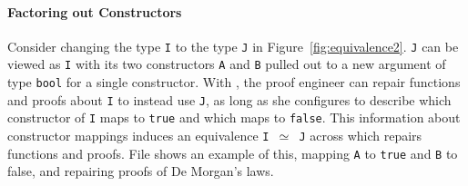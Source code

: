 \paragraph{Factoring out Constructors}
Consider changing the type \lstinline{I} to the type \lstinline{J} 
in Figure~\ref{fig:equivalence2}.
\lstinline{J} can be viewed as \lstinline{I} with its two constructors \lstinline{A} and \lstinline{B} pulled out to a
new argument of type \lstinline{bool} for a single constructor.
With \toolnamec, the proof engineer can repair functions and proofs about \lstinline{I} to instead use \lstinline{J},
as long as she configures \toolnamec to describe which constructor 
of \lstinline{I} maps to \lstinline{true} and which maps to \lstinline{false}.
This information about constructor mappings induces an equivalence \lstinline{I }$\simeq$\lstinline{ J}
across which \toolnamec repairs functions and proofs.
File \href{https://github.com/uwplse/pumpkin-pi/blob/v2.0.0/plugin/coq/playground/constr_refactor.v}{} shows an example of this, mapping \lstinline{A} to \lstinline{true} and \lstinline{B} to false,
and repairing proofs of De Morgan's laws. %
%

%

